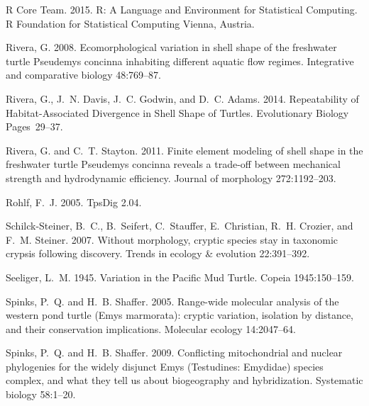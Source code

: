 \documentclass[12pt,letterpaper]{article}
\begin{document}
\begin{thebibliography}{77}
    {R Core Team}. 2015. R: A Language and Environment for Statistical Computing. R
    Foundation for Statistical Computing Vienna, Austria.

    Rivera, G. 2008. {Ecomorphological variation in shell shape of the freshwater
    turtle Pseudemys concinna inhabiting different aquatic flow regimes.}
    Integrative and comparative biology 48:769--87.

    Rivera, G., J.~N. Davis, J.~C. Godwin, and D.~C. Adams. 2014. {Repeatability of
    Habitat-Associated Divergence in Shell Shape of Turtles}. Evolutionary
    Biology Pages~29--37.

    Rivera, G. and C.~T. Stayton. 2011. {Finite element modeling of shell shape in
      the freshwater turtle Pseudemys concinna reveals a trade-off between
    mechanical strength and hydrodynamic efficiency.} Journal of morphology
    272:1192--203.

    Rohlf, F.~J. 2005. {TpsDig 2.04}.

    Schilck-Steiner, B.~C., B.~Seifert, C.~Stauffer, E.~Christian, R.~H. Crozier,
    and F.~M. Steiner. 2007. {Without morphology, cryptic species stay in
    taxonomic crypsis following discovery}. Trends in ecology \& evolution
    22:391--392.

    Seeliger, L.~M. 1945. {Variation in the Pacific Mud Turtle}. Copeia
    1945:150--159.

    Spinks, P.~Q. and H.~B. Shaffer. 2005. {Range-wide molecular analysis of the
      western pond turtle (Emys marmorata): cryptic variation, isolation by
    distance, and their conservation implications.} Molecular ecology
    14:2047--64.

    Spinks, P.~Q. and H.~B. Shaffer. 2009. {Conflicting mitochondrial and nuclear
      phylogenies for the widely disjunct Emys (Testudines: Emydidae) species
    complex, and what they tell us about biogeography and hybridization.}
    Systematic biology 58:1--20.


\end{thebibliography}
\end{document}
